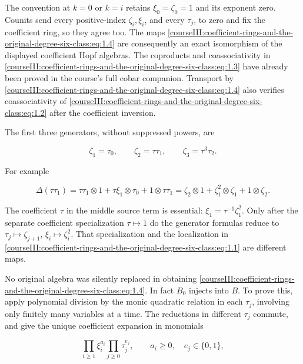The convention at \(k=0\) or \(k=i\) retains \(\xi_0=\zeta_0=1\) and its exponent zero. Counits send every positive-index \(\zeta_i,\xi_i\), and every \(\tau_j\), to zero and fix the coefficient ring, so they agree too. The maps \eqref{courseIII:coefficient-rings-and-the-original-degree-six-class:eq:1.4} are consequently an exact isomorphism of the displayed coefficient Hopf algebras. The coproducts and coassociativity in \eqref{courseIII:coefficient-rings-and-the-original-degree-six-class:eq:1.3} have already been proved in the course's full cobar companion. Transport by \eqref{courseIII:coefficient-rings-and-the-original-degree-six-class:eq:1.4} also verifies coassociativity of \eqref{courseIII:coefficient-rings-and-the-original-degree-six-class:eq:1.2} after the coefficient inversion.

The first three generators, without suppressed powers, are

\begin{equation}
\zeta_1=\tau_0,\qquad
 \zeta_2=\tau\tau_1,\qquad
 \zeta_3=\tau^3\tau_2.
 \label{courseIII:coefficient-rings-and-the-original-degree-six-class:eq:1.10}
\end{equation}

For example

\begin{equation}
\Delta(\tau\tau_1)=
 \tau\tau_1\otimes1+\tau\xi_1\otimes\tau_0+1\otimes\tau\tau_1
  =\zeta_2\otimes1+\zeta_1^2\otimes\zeta_1+1\otimes\zeta_2.
 \label{courseIII:coefficient-rings-and-the-original-degree-six-class:eq:1.11}
\end{equation}

The coefficient \(\tau\) in the middle source term is essential: \(\xi_1=\tau^{-1}\zeta_1^2\). Only after the separate coefficient specialization \(\tau\mapsto1\) do the generator formulas reduce to \(\tau_j\mapsto\zeta_{j+1}\), \(\xi_i\mapsto\zeta_i^2\). That specialization and the localization in \eqref{courseIII:coefficient-rings-and-the-original-degree-six-class:eq:1.1} are different maps.

No original algebra was silently replaced in obtaining \eqref{courseIII:coefficient-rings-and-the-original-degree-six-class:eq:1.4}. In fact \(B_0\) injects into \(B\). To prove this, apply polynomial division by the monic quadratic relation in each \(\tau_j\), involving only finitely many variables at a time. The reductions in different \(\tau_j\) commute, and give the unique coefficient expansion in monomials

\begin{equation}
\prod_{i\geq1}\xi_i^{a_i}\prod_{j\geq0}\tau_j^{e_j},
 \qquad a_i\geq0,\quad e_j\in\{0,1\},
 \label{courseIII:coefficient-rings-and-the-original-degree-six-class:eq:1.12}
\end{equation}

